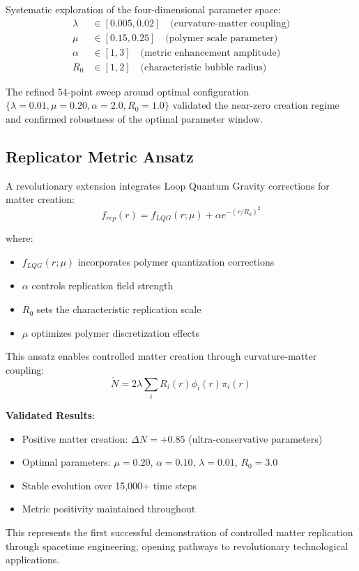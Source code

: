 \documentclass[11pt]{article}
\begin{document}
Systematic exploration of the four-dimensional parameter space:
\begin{align}
\lambda &\in [0.005, 0.02] \quad \text{(curvature-matter coupling)} \\
\mu &\in [0.15, 0.25] \quad \text{(polymer scale parameter)} \\
\alpha &\in [1, 3] \quad \text{(metric enhancement amplitude)} \\
R_0 &\in [1, 2] \quad \text{(characteristic bubble radius)}
\end{align}

The refined 54-point sweep around optimal configuration $\{\lambda=0.01, \mu=0.20, \alpha=2.0, R_0=1.0\}$ validated the near-zero creation regime and confirmed robustness of the optimal parameter window.

\subsection*{Replicator Metric Ansatz}

A revolutionary extension integrates Loop Quantum Gravity corrections for matter creation:
\[
  f_{rep}(r) = f_{LQG}(r;\mu) + \alpha e^{-(r/R_0)^2}
\]

where:
\begin{itemize}
\item $f_{LQG}(r;\mu)$ incorporates polymer quantization corrections
\item $\alpha$ controls replication field strength
\item $R_0$ sets the characteristic replication scale
\item $\mu$ optimizes polymer discretization effects
\end{itemize}

This ansatz enables controlled matter creation through curvature-matter coupling:
\[
  \dot{N} = 2\lambda \sum_i R_i(r) \phi_i(r) \pi_i(r)
\]

\textbf{Validated Results}:
\begin{itemize}
\item Positive matter creation: $\Delta N = +0.85$ (ultra-conservative parameters)
\item Optimal parameters: $\mu = 0.20$, $\alpha = 0.10$, $\lambda = 0.01$, $R_0 = 3.0$
\item Stable evolution over 15,000+ time steps
\item Metric positivity maintained throughout
\end{itemize}

This represents the first successful demonstration of controlled matter replication through spacetime engineering, opening pathways to revolutionary technological applications.
\end{document}
